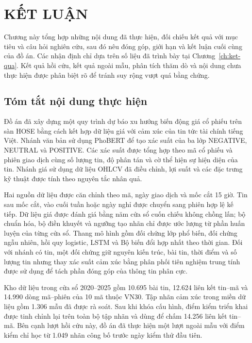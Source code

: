 \documentclass[12pt, a4paper, oneside]{report}
\begin{document}
\chapter{KẾT LUẬN}
\label{ch:ket-luan}

Chương này tổng hợp những nội dung đã thực hiện, đối chiếu kết quả với mục tiêu và câu
hỏi nghiên cứu, sau đó nêu đóng góp, giới hạn và kết luận cuối cùng của đồ án. Các nhận
định chỉ dựa trên số liệu đã trình bày tại Chương~\ref{ch:ket-qua}. Kết quả hồi cứu, kết
quả ngoài mẫu, phân tích thăm dò và nội dung chưa thực hiện được phân biệt rõ để tránh
suy rộng vượt quá bằng chứng.

\section{Tóm tắt nội dung thực hiện}

Đồ án đã xây dựng một quy trình dự báo xu hướng biến động giá cổ phiếu trên sàn HOSE
bằng cách kết hợp dữ liệu giá với cảm xúc của tin tức tài chính tiếng Việt. Nhánh văn
bản sử dụng PhoBERT để tạo xác suất của ba lớp NEGATIVE, NEUTRAL và POSITIVE. Các xác
suất được tổng hợp theo mã cổ phiếu và phiên giao dịch cùng số lượng tin, độ phân tán
và cờ thể hiện sự hiện diện của tin. Nhánh giá sử dụng dữ liệu OHLCV đã điều chỉnh,
lợi suất và các đặc trưng kỹ thuật được tính theo nguyên tắc nhân quả.

Hai nguồn dữ liệu được căn chỉnh theo mã, ngày giao dịch và mốc cắt 15 giờ. Tin sau mốc
cắt, vào cuối tuần hoặc ngày nghỉ được chuyển sang phiên hợp lệ kế tiếp. Dữ liệu giá
được đánh giá bằng năm cửa sổ cuốn chiếu không chồng lấn; bộ chuẩn hóa, bộ điền khuyết
và ngưỡng tạo nhãn chỉ được ước lượng từ phần huấn luyện của từng cửa sổ. Thang mô hình
gồm đối chứng lớp phổ biến, đối chứng ngẫu nhiên, hồi quy logistic, LSTM và Bộ biến đổi
hợp nhất theo thời gian. Đối với nhánh có tin, một đối chứng giữ nguyên kiến trúc, bài
tin, thời điểm và số lượng tin nhưng thay xác suất cảm xúc bằng phân phối tiên nghiệm
trung tính được sử dụng để tách phần đóng góp của thông tin phân cực.

Kho dữ liệu trong cửa sổ 2020--2025 gồm 10.695 bài tin, 12.624 liên kết tin--mã và
14.990 dòng mã--phiên của 10 mã thuộc VN30. Tập nhãn cảm xúc trong miền dữ liệu gồm
1.306 mẫu đã được rà soát. Sau khi khóa cấu hình, điểm kiểm triển khai được tinh chỉnh
lại trên toàn bộ tập nhãn và dùng để chấm 14.256 liên kết tin--mã. Bên cạnh lượt hồi
cứu này, đồ án đã thực hiện một lượt ngoài mẫu với điểm kiểm chỉ học từ 1.049 nhãn
công bố trước ngày kiểm thử đầu tiên.
\end{document}
